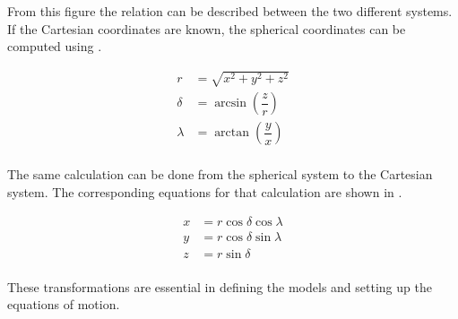 From this figure the relation can be described between the two different systems. If the Cartesian coordinates are known, the spherical coordinates can be computed using .

\begin{equation} \label{eq:cart2spher}
\begin{split}
r &= \sqrt{x^{2}+y^{2}+z^{2}}\\
\delta &= \arcsin \left(\dfrac{z}{r}\right)\\
\lambda &= \arctan \left(\dfrac{y}{x}\right)\\
\end{split}
\end{equation}





The same calculation can be done from the spherical system to the Cartesian system. The corresponding equations for that calculation are shown in .

\begin{equation} \label{eq:spher2cart}
\begin{split}
x &= r\cos\delta\cos\lambda\\
y &= r\cos\delta\sin\lambda\\
z &= r\sin\delta\\
\end{split}
\end{equation}

These transformations are essential in defining the models and setting up the equations of motion.











